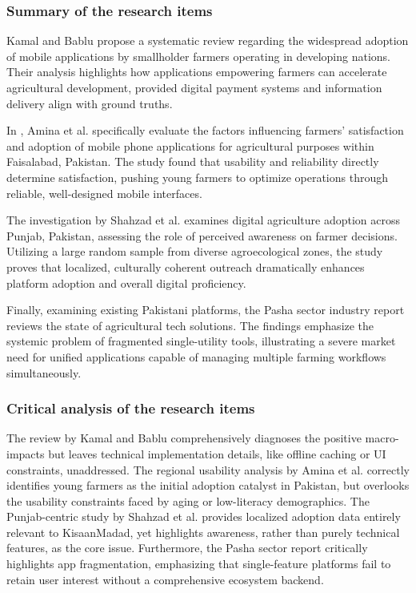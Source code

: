 \documentclass{FastFyp}
\begin{document}
\subsubsection{Summary of the research items}
Kamal and Bablu \cite{kamal2023mobile} propose a systematic review regarding the widespread adoption of mobile applications by smallholder farmers operating in developing nations. Their analysis highlights how applications empowering farmers can accelerate agricultural development, provided digital payment systems and information delivery align with ground truths.

In \cite{amina2025factors}, Amina et al. specifically evaluate the factors influencing farmers' satisfaction and adoption of mobile phone applications for agricultural purposes within Faisalabad, Pakistan. The study found that usability and reliability directly determine satisfaction, pushing young farmers to optimize operations through reliable, well-designed mobile interfaces.

The investigation by Shahzad et al. \cite{shahzad2024mobile} examines digital agriculture adoption across Punjab, Pakistan, assessing the role of perceived awareness on farmer decisions. Utilizing a large random sample from diverse agroecological zones, the study proves that localized, culturally coherent outreach dramatically enhances platform adoption and overall digital proficiency.

Finally, examining existing Pakistani platforms, the Pasha \cite{pasha2024agritech} sector industry report reviews the state of agricultural tech solutions. The findings emphasize the systemic problem of fragmented single-utility tools, illustrating a severe market need for unified applications capable of managing multiple farming workflows simultaneously.

\subsubsection{Critical analysis of the research items}
The review by Kamal and Bablu \cite{kamal2023mobile} comprehensively diagnoses the positive macro-impacts but leaves technical implementation details, like offline caching or UI constraints, unaddressed. The regional usability analysis by Amina et al. \cite{amina2025factors} correctly identifies young farmers as the initial adoption catalyst in Pakistan, but overlooks the usability constraints faced by aging or low-literacy demographics. The Punjab-centric study by Shahzad et al. \cite{shahzad2024mobile} provides localized adoption data entirely relevant to KisaanMadad, yet highlights awareness, rather than purely technical features, as the core issue. Furthermore, the Pasha \cite{pasha2024agritech} sector report critically highlights app fragmentation, emphasizing that single-feature platforms fail to retain user interest without a comprehensive ecosystem backend.
\end{document}
